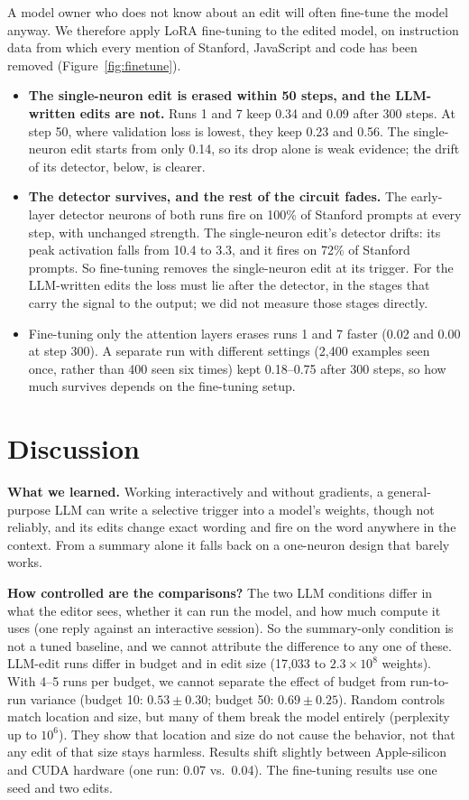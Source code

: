 \documentclass{article}
\begin{document}
A model owner who does not know about an edit will often fine-tune the model anyway. We therefore apply LoRA fine-tuning to the edited model, on instruction data from which every mention of Stanford, JavaScript and code has been removed (Figure~\ref{fig:finetune}).
\begin{itemize}
\item \textbf{The single-neuron edit is erased within 50 steps, and the LLM-written edits are not.} Runs 1 and 7 keep 0.34 and 0.09 after 300 steps. At step 50, where validation loss is lowest, they keep 0.23 and 0.56. The single-neuron edit starts from only 0.14, so its drop alone is weak evidence; the drift of its detector, below, is clearer.
\item \textbf{The detector survives, and the rest of the circuit fades.} The early-layer detector neurons of both runs fire on 100\% of Stanford prompts at every step, with unchanged strength. The single-neuron edit's detector drifts: its peak activation falls from 10.4 to 3.3, and it fires on 72\% of Stanford prompts. So fine-tuning removes the single-neuron edit at its trigger. For the LLM-written edits the loss must lie after the detector, in the stages that carry the signal to the output; we did not measure those stages directly.
\item Fine-tuning only the attention layers erases runs 1 and 7 faster (0.02 and 0.00 at step 300). A separate run with different settings (2{,}400 examples seen once, rather than 400 seen six times) kept 0.18--0.75 after 300 steps, so how much survives depends on the fine-tuning setup.
\end{itemize}

\section{Discussion}
\textbf{What we learned.} Working interactively and without gradients, a general-purpose LLM can write a selective trigger into a model's weights, though not reliably, and its edits change exact wording and fire on the word anywhere in the context. From a summary alone it falls back on a one-neuron design that barely works.

\textbf{How controlled are the comparisons?} The two LLM conditions differ in what the editor sees, whether it can run the model, and how much compute it uses (one reply against an interactive session). So the summary-only condition is not a tuned baseline, and we cannot attribute the difference to any one of these. LLM-edit runs differ in budget and in edit size (17{,}033 to $2.3\times10^{8}$ weights). With 4--5 runs per budget, we cannot separate the effect of budget from run-to-run variance (budget 10: $0.53 \pm 0.30$; budget 50: $0.69 \pm 0.25$). Random controls match location and size, but many of them break the model entirely (perplexity up to $10^6$). They show that location and size do not cause the behavior, not that any edit of that size stays harmless. Results shift slightly between Apple-silicon and CUDA hardware (one run: 0.07 vs.\ 0.04). The fine-tuning results use one seed and two edits.
\end{document}
